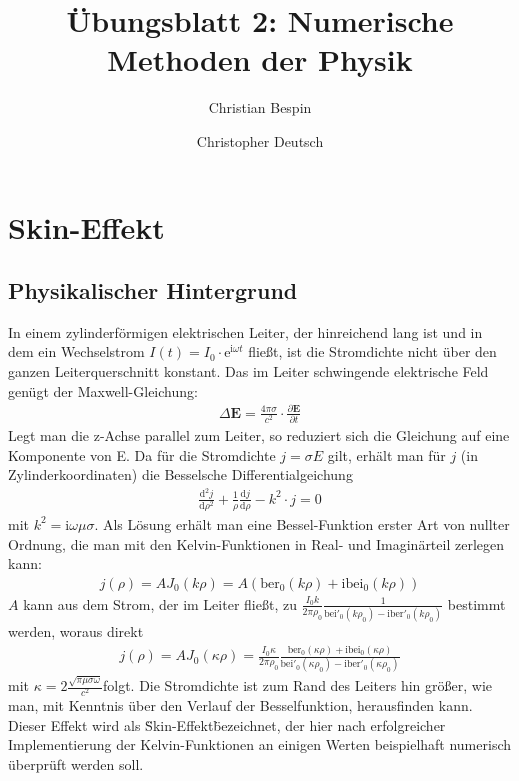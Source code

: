 \documentclass[10pt,a4paper]{article}
\author{Christian Bespin \and Christopher Deutsch}
\title{Übungsblatt 2: Numerische Methoden der Physik}
\begin{document}
\maketitle

\setcounter{section}{1}

\section{Skin-Effekt}

\subsection{Physikalischer Hintergrund}

In einem zylinderförmigen elektrischen Leiter, der hinreichend lang ist und in dem ein Wechselstrom $I(t)=I_0\cdot\text{e}^{\text{i}\omega t}$ fließt, ist die Stromdichte nicht über den ganzen Leiterquerschnitt konstant. Das im Leiter schwingende elektrische Feld genügt der Maxwell-Gleichung\cite{landau}:
\begin{align}
	\Delta\mathbf{E}=\frac{4\pi\sigma}{c^2}\cdot \frac{\partial \mathbf{E}}{\partial t}
	\label{eqn:maxwellgleichung}
\end{align}
Legt man die z-Achse parallel zum Leiter, so reduziert sich die Gleichung auf eine Komponente von E. Da für die Stromdichte $j=\sigma E$ gilt, erhält man für $j$ (in Zylinderkoordinaten) die Besselsche Differentialgeichung
\begin{align}
	\frac{\mathrm{d}^2 j}{\mathrm{d}\rho^2} + \frac{1}{\rho}\frac{\mathrm{d}j}{\mathrm{d}\rho} - k^2\cdot j=0
	\label{eqn:besseldgl} 
\end{align}
mit $k^2=\mathrm{i}\omega\mu\sigma$. Als Lösung\cite{kazimierczuk} erhält man eine Bessel-Funktion erster Art von nullter Ordnung, die man mit den Kelvin-Funktionen in Real- und Imaginärteil zerlegen kann:
\begin{align}
	j(\rho)=A J_0(k\rho)=A(\mathrm{ber}_0(k\rho)+\mathrm{i bei}_0(k\rho))
\end{align}
$A$ kann aus dem Strom, der im Leiter fließt, zu $\frac{I_0 k}{2\pi\rho_0}\frac{1}{\mathrm{bei}'_0(k\rho_0)-\mathrm{i ber}'_0(k\rho_0)}$ bestimmt werden\cite{kazimierczuk}, woraus direkt
\begin{align}
	j(\rho)=A J_0(\kappa\rho)=\frac{I_0 \kappa}{2\pi\rho_0}\frac{\mathrm{ber}_0(\kappa\rho)+\mathrm{i bei}_0(\kappa\rho)}{\mathrm{bei}'_0(\kappa\rho_0)-\mathrm{i ber}'_0(\kappa\rho_0)}
\end{align}
mit $\kappa=2\frac{\sqrt{\pi\mu\sigma\omega}}{c^2}$folgt. Die Stromdichte ist zum Rand des Leiters hin größer, wie man, mit Kenntnis über den Verlauf der Besselfunktion, herausfinden kann. Dieser Effekt wird als \"Skin-Effekt\" bezeichnet, der hier nach erfolgreicher Implementierung der Kelvin-Funktionen an einigen Werten beispielhaft numerisch überprüft werden soll.
\end{document}
